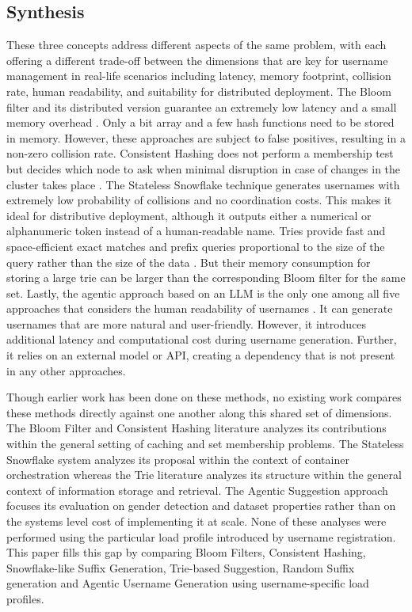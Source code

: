 \documentclass[conference]{IEEEtran}
\begin{document}
\subsection{Synthesis}
These three concepts address different aspects of the same problem,
with each offering a different trade-off between the dimensions that are key for username management in real-life scenarios including latency, memory footprint, collision rate, human readability, and suitability for distributed deployment. The Bloom filter and its
distributed version guarantee an extremely low latency
and a small memory overhead \cite{b1,b2}. Only a bit array and a few hash functions need to be stored in memory. However, these approaches are subject to false positives, resulting in a non-zero collision rate. Consistent Hashing does not perform a membership test but decides which node to ask when minimal disruption in case of changes in the cluster takes place \cite{b3}. The Stateless Snowflake technique generates usernames with extremely low probability of collisions and no coordination costs\cite{b4}. This makes it ideal for distributive deployment, although it outputs either a numerical or alphanumeric token instead of a human-readable name. Tries provide fast and space-efficient exact matches and prefix queries proportional to the size of the query rather than the size of the data \cite{b5}. But their memory consumption for storing a large trie can be larger than the corresponding Bloom filter for the same set. Lastly, the agentic approach based on an LLM is the only one among all five approaches that considers the human readability of usernames \cite{b6}. It can generate usernames that are more natural and user-friendly. However, it introduces additional latency and computational cost during username generation. Further, it relies on an external model or API, creating a dependency that is not present in any other approaches.

Though earlier work has been done on these methods, no existing work compares these methods directly against one another along this shared set of dimensions. The Bloom Filter and Consistent Hashing literature analyzes its contributions within the general setting of caching and set membership problems. The Stateless Snowflake system analyzes its proposal within the context of container orchestration whereas the Trie literature analyzes its structure within the general context of information storage and retrieval. The Agentic Suggestion approach focuses its evaluation on gender detection and dataset properties rather than on the systems level cost of implementing it at scale. None of these analyses were performed using the particular load profile introduced by username registration. This paper fills this gap by comparing Bloom Filters, Consistent Hashing, Snowflake-like Suffix  Generation, Trie-based Suggestion, Random Suffix generation and Agentic Username Generation using username-specific load profiles.
\end{document}

